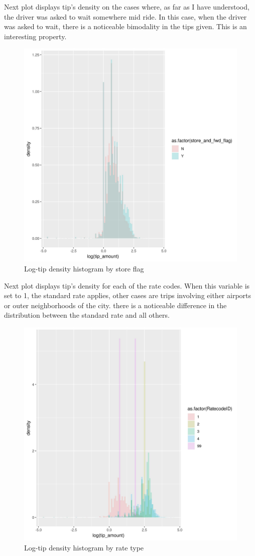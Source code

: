 \documentclass[11pt]{article}
\begin{document}
Next plot displays tip's density on the cases where, as far as I have
understood, the driver was asked to wait somewhere mid ride.
In this case, when the driver was asked to wait, there is a noticeable
bimodality in the tips given. This is an interesting property.
\begin{figure}[htbp]
\centering
\includegraphics[width=.9\linewidth]{./plots/storeCodeTipDensityHist.jpg}
\caption{\label{fig:org4c29f79}
Log-tip density histogram by store flag}
\end{figure}

Next plot displays tip's density for each of the rate codes.
When this variable is set to 1, the standard rate applies, other
cases are trips involving either airports or outer neighborhoods of
the city. there is a noticeable difference in the distribution between
the standard rate and all others.
\begin{figure}[htbp]
\centering
\includegraphics[width=.9\linewidth]{./plots/rateCodeTipDensityHist.jpg}
\caption{\label{fig:org4240786}
Log-tip density histogram by rate type}
\end{figure}
\end{document}
